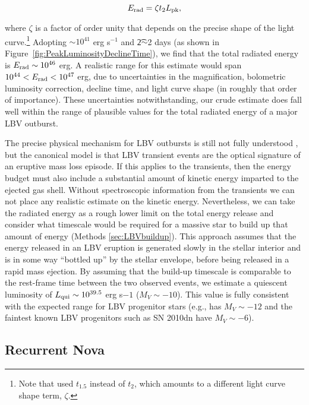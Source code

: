 \begin{equation}
  \label{eqn:Erad}
  E_{\rm rad} = \zeta \t2 \Lpk,
\end{equation}

\noindent where $\zeta$ is a factor of order unity that depends on the
precise shape of the light curve.\footnote{Note that
  \citet{Smith:2011b} used $t_{1.5}$ instead of $t_2$, which amounts
  to a different light curve shape term, $\zeta$.}  Adopting
\Lpk$\sim10^{41}$ erg s$^{-1}$ and \t2$\sim$2 days (as shown in
Figure~\ref{fig:PeakLuminosityDeclineTime}), we find that the total
radiated energy is $E_{\rm rad}\sim10^{46}$ erg.  A realistic range
for this estimate would span $10^{44}<E_{\rm rad}<10^{47}$ erg, due to
uncertainties in the magnification, bolometric luminosity correction,
decline time, and light curve shape (in roughly that order of
importance). These uncertainties notwithstanding, our crude estimate
does fall well within the range of plausible values for the total
radiated energy of a major LBV outburst.

The precise physical mechanism for LBV outbursts is still not fully
understood \citep[e.g.][]{Smith:2006,Woosley:2007,Dessart:2010}, but
the canonical model is that LBV transient events are the optical
signature of an eruptive mass loss episode.  If this applies to the
\spock transients, then the energy budget must also include a
substantial amount of kinetic energy imparted to the ejected gas
shell. Without spectroscopic information from the \spock transients we
can not place any realistic estimate on the kinetic
energy. Nevertheless, we can take the radiated energy as a rough lower
limit on the total energy release and consider what timescale would be
required for a massive star to build up that amount of energy (Methods \ref{sec:LBVbuildup}). This approach assumes that the energy
released in an LBV eruption is generated slowly in the stellar
interior and is in some way ``bottled up'' by the stellar envelope,
before being released in a rapid mass ejection.  By assuming that the
build-up timescale is comparable to the rest-frame time between the
two observed events, we estimate a quiescent luminosity of $L_{\rm
  qui}\sim10^{39.5}$ erg s${-1}$ ($M_V\sim-10$).  This value is fully
consistent with the expected range for LBV progenitor stars (e.g.,
\etacar has $M_V\sim-12$ and the faintest known LBV progenitors such
as SN 2010dn have $M_V\sim-6$).


\subsection{Recurrent Nova}\label{sec:RNe}

